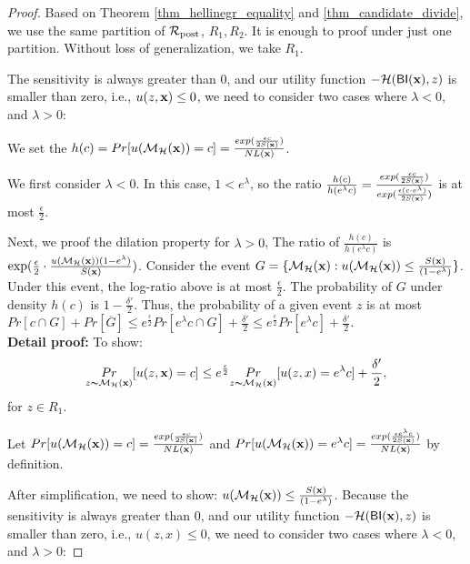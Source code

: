 \documentclass{article}
\begin{document}
\begin{proof}
Based on Theorem \ref{thm_hellinegr_equality} and \ref{thm_candidate_divide}, we use the same partition of $\mathcal{R}_{\textup{post}}$, $R_1, R_2$. It is enough to proof under just one partition. Without loss of generalization, we take $R_1$.

The sensitivity is always greater than 0, and our utility function $-\mathcal{H}(\mathsf{BI}(\textbf{x}),z)$ is smaller than zero, i.e., $u(z,\textbf{x}) \leq 0$, we need to consider two cases where $\lambda < 0$, and $\lambda > 0$:

We set the $h(c) = Pr[u(\mathcal{M}_{\mathcal{H}}(\textbf{x})) = c] = \frac{exp(\frac{\epsilon c}{2 S(\textbf{x})})}{NL(\textbf{x})}$.

We first consider $\lambda < 0$. In this case, $1 < e ^ {\lambda}$, so the ratio $\frac{h(c)}{h(e^{\lambda}c)} = \frac{exp(\frac{\epsilon c}{2 S(\textbf{x})})}{exp(\frac{\epsilon (c \cdot e^{\lambda})}{2 S(\textbf{x})})}$ is at most $\frac{\epsilon}{2}$.

Next, we proof the dilation property for $\lambda > 0$, The ratio of $\frac{h(c)}{h(e^{\lambda}c)}$ is $\exp(\frac{\epsilon}{2} \cdot \frac{u(\mathcal{M}_{\mathcal{H}}(\textbf{x})) (1 - e^{\lambda})}{S(\textbf{x})})$. Consider the event $G = \{ \mathcal{M}_{\mathcal{H}}(\textbf{x}) : u(\mathcal{M}_{\mathcal{H}}(\textbf{x})) \leq \frac{S(\textbf{x})}{(1 - e^{\lambda})}\}$. Under this event, the log-ratio above is at most $\frac{\epsilon}{2}$. The probability of $G$ under density $h(c)$ is $1 - \frac{\delta'}{2}$. Thus, the probability of a given event $z$ is at most $Pr[c \cap G] + Pr[\overline{G}] \leq e^{\frac{\epsilon}{2}} Pr[e^{\lambda}c \cap G] + \frac{\delta'}{2} \leq e^{\frac{\epsilon}{2}} Pr[e^{\lambda}c] + \frac{\delta'}{2}$.\\


\textbf{Detail proof:}
	To show:
	\begin{equation*}
	\underset{z \thicksim \mathcal{M}_{\mathcal{H}}(\textbf{x})}{Pr}[u(z,\textbf{x}) = c]
	\leq
	e^{\frac{\epsilon}{2}} \underset{z \thicksim \mathcal{M}_{\mathcal{H}}(\textbf{x})}{Pr}[u(z,x) = e^{\lambda} c] + \frac{\delta'}{2},
	\end{equation*}
	for $z \in R_1$.

	Let $Pr[u(\mathcal{M}_{\mathcal{H}}(\textbf{x})) = c] = \frac{exp(\frac{\epsilon c}{2 S(\textbf{x})})}{NL(\textbf{x})}$ and $Pr[u(\mathcal{M}_{\mathcal{H}}(\textbf{x})) = e^{\lambda} c] = \frac{exp(\frac{\epsilon e^{\lambda} c}{2 S(\textbf{x})})}{NL(\textbf{x})}$ by definition.

	After simplification, we need to show: $u(\mathcal{M}_{\mathcal{H}}(\textbf{x})) \leq \frac{S(\textbf{x})}{(1 - e ^ {\lambda})}$.
	Because the sensitivity is always greater than 0, and our utility function $-\mathcal{H}(\mathsf{BI}(\textbf{x}),z)$ is smaller than zero, i.e., $u(z,x) \leq 0$, we need to consider two cases where $\lambda < 0$, and $\lambda > 0$:


\end{proof}
\end{document}
